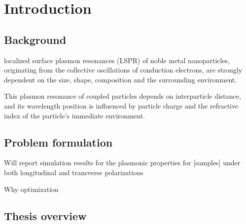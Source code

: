 
\chapter{Introduction}

\section{Background}
localized surface plasmon resonances (LSPR) of noble metal nanoparticles, originating from the collective oscillations of conduction electrons, are strongly dependent on the size, shape, composition and the surrounding environment. %

This plasmon resonance of coupled particles depends on interparticle distance, and its wavelength position is influenced by particle charge and the refractive index of the particle's immediate environment.

\section{Problem formulation}
Will report simulation results for the plasmonic properties for [samples] under both longitudinal and transverse polarizations 

Why optimization
\section{Thesis overview}

